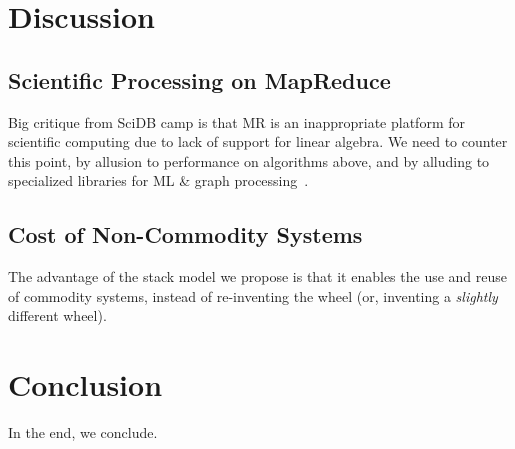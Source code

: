 \documentclass{acm_proc_article-sp}
\begin{document}
\section{Discussion}
\label{sec:discussion}

\subsection{Scientific Processing on MapReduce}
\label{sec:scientific-compute-mr}

Big critique from SciDB camp is that MR is an inappropriate platform for scientific computing due to
lack of support for linear algebra. We need to counter this point, by allusion to performance on
algorithms above, and by alluding to specialized libraries for ML \& graph
processing~\cite{sparks13, xin13}.

\subsection{Cost of Non-Commodity Systems}
\label{sec:commodity}

The advantage of the stack model we propose is that it enables the use and reuse of commodity
systems, instead of re-inventing the wheel (or, inventing a \emph{slightly} different wheel).

\section{Conclusion}
\label{sec:conclusion}

In the end, we conclude.

\appendix


 

\end{document}
